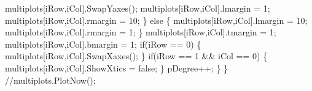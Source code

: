 {\btab \btab multiplots[iRow,iCol].SwapYaxes();\newline 
\btab \btab multiplots[iRow,iCol].lmargin = 1;\newline 
\btab \btab multiplots[iRow,iCol].rmargin = 10;\newline 
\btab \} else \{\newline 
\btab \btab multiplots[iRow,iCol].lmargin = 10;\newline 
\btab \btab multiplots[iRow,iCol].rmargin = 1;\newline 
\btab \}\newline 
\btab multiplots[iRow,iCol].tmargin = 1;\newline 
\btab multiplots[iRow,iCol].bmargin = 1;\newline 
\btab if(iRow == 0) \{\newline 
\btab \btab multiplots[iRow,iCol].SwapXaxes();\newline 
\btab \}\newline 
\btab if(iRow == 1 && iCol == 0) \{  \newline 
\btab \btab multiplots[iRow,iCol].ShowXtics = false;\newline 
\btab \}\newline 
\btab pDegree++;\newline 
\}                        \newline 
\}\newline 
//multiplots.PlotNow();
 }
\BoSSSexe
{}
\BoSSSexe
{}
\BoSSSexe
{}
\BoSSSexe
